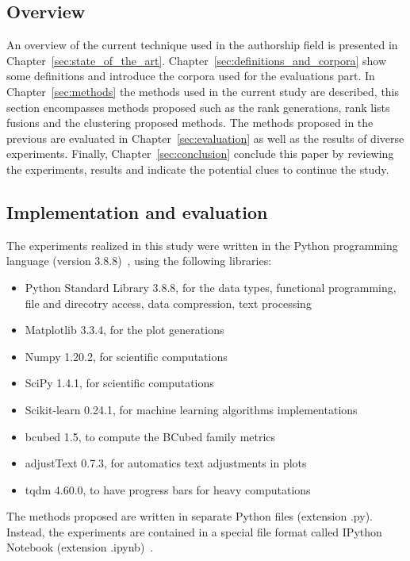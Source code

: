 \subsection{Overview}

An overview of the current technique used in the authorship field is presented in Chapter~\ref{sec:state_of_the_art}.
Chapter~\ref{sec:definitions_and_corpora} show some definitions and introduce the corpora used for the evaluations part.
In Chapter~\ref{sec:methods} the methods used in the current study are described, this section encompasses methods proposed such as the rank generations, rank lists fusions and the clustering proposed methods.
The methods proposed in the previous are evaluated in Chapter~\ref{sec:evaluation} as well as the results of diverse experiments.
Finally, Chapter~\ref{sec:conclusion} conclude this paper by reviewing the experiments, results and indicate the potential clues to continue the study.

\subsection{Implementation and evaluation}

The experiments realized in this study were written in the Python programming language (version 3.8.8)~\cite{python}, using the following libraries:
\begin{itemize}
  \item Python Standard Library 3.8.8, for the data types, functional programming, file and direcotry access, data compression, text processing~\cite{python_standard_library}
  \item Matplotlib 3.3.4, for the plot generations~\cite{matplotlib}
  \item Numpy 1.20.2, for scientific computations~\cite{numpy}
  \item SciPy 1.4.1, for scientific computations~\cite{scipy}
  \item Scikit-learn 0.24.1, for machine learning algorithms implementations~\cite{sklearn}
  \item bcubed 1.5, to compute the BCubed family metrics~\cite{bcubed_gh}
  \item adjustText 0.7.3, for automatics text adjustments in plots~\cite{adjustText}
  \item tqdm 4.60.0, to have progress bars for heavy computations~\cite{tqdm}
\end{itemize}
The methods proposed are written in separate Python files (extension .py).
Instead, the experiments are contained in a special file format called IPython Notebook (extension .ipynb)~\cite{jupyter}.

